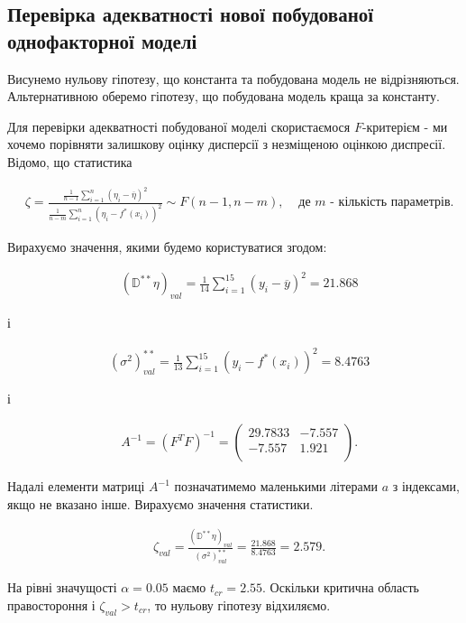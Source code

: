 \documentclass[14pt,a4paper]{scrartcl}
\theoremstyle{definition}
\theoremstyle{remark}
\theoremstyle{definition}
\theoremstyle{definition}
\begin{document}
\subsection{Перевірка адекватності нової побудованої однофакторної моделі}

Висунемо нульову гіпотезу, що константа та побудована модель не відрізняються. Альтернативною оберемо гіпотезу, що побудована модель краща за константу.

Для перевірки адекватності побудованої моделі скористаємося $F$-критерієм - ми хочемо порівняти залишкову оцінку дисперсії з незміщеною оцінкою диспресії. Відомо, що статистика

\begin{align*}
  & \zeta = \frac{\frac{1}{n - 1} \sum_{i = 1}^{n} (\eta_{i} - \overline{\eta})^2}{\frac{1}{n - m} \sum_{i = 1}^{n} (\eta_{i} - f^{*}(x_{i}))^2} \sim F(n - 1, n - m),  & \text{  де  } m \text{ - кількість параметрів.}
\end{align*}

Вирахуємо значення, якими будемо користуватися згодом:

\begin{align*}
   & (\mathbb{D}^{**}\eta)_{val} = \frac{1}{14} \sum_{i = 1}^{15} (y_{i} - \overline{y})^2 = 21.868
\end{align*}

і

\begin{align*}
   & (\sigma^2)^{**}_{val} = \frac{1}{13} \sum_{i = 1}^{15} (y_{i} - f^{*}(x_{i}))^2 = 8.4763
\end{align*}

і

\begin{align*}
  & A^{-1} = (F^{T}F)^{-1} = \begin{pmatrix}
    29.7833 & -7.557 \\
    -7.557 & 1.921 \\
  \end{pmatrix}.
\end{align*}

Надалі елементи матриці $A^{-1}$ позначатимемо маленькими літерами $a$ з індексами, якщо не вказано інше. Вирахуємо значення статистики.

\begin{align*}
  & \zeta_{val} = \frac{(\mathbb{D}^{**}\eta)_{val}}{(\sigma^2)^{**}_{val}} = \frac{21.868}{8.4763} = 2.579.
\end{align*}

На рівні значущості $\alpha = 0.05$ маємо $t_{cr} = 2.55$. Оскільки критична область правостороння і $\zeta_{val} > t_{cr}$, то нульову гіпотезу відхиляємо.
\end{document}
